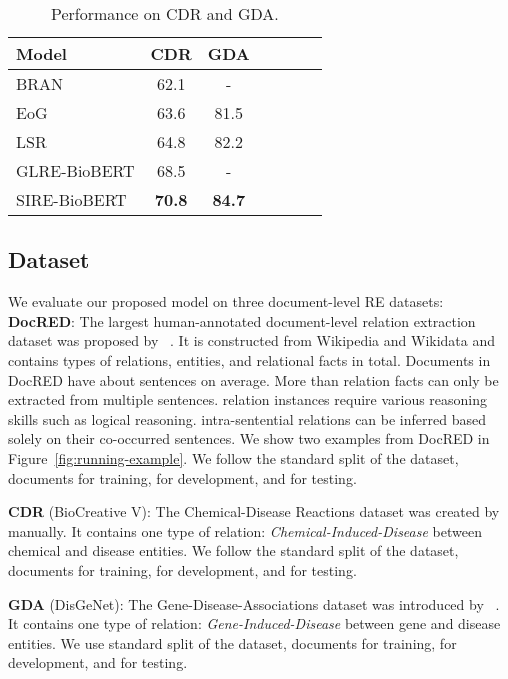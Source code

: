 \documentclass[11pt,a4paper]{article}
\begin{document}
\begin{table}[htbp]
\centering
\small
\begin{tabular}{lcccccc}
\hline
\bf Model  & \bf CDR  & \bf GDA \\ 
\hline
BRAN \citep{BRAN} & 62.1 & - \\
EoG \citep{GLRE} & 63.6 & 81.5 \\
LSR \citep{LSR} & 64.8 & 82.2 \\
GLRE-BioBERT \citep{GLRE} & 68.5 & - \\
\hline
SIRE-BioBERT & \textbf{70.8} & \textbf{84.7} \\
\hline
\end{tabular}
\caption{Performance on CDR and GDA.
}
\label{table:results2}
\end{table}

\subsection{Dataset}
We evaluate our proposed model on three document-level RE datasets: \\
\textbf{DocRED}: 
The largest human-annotated document-level relation extraction dataset was proposed by ~\citet{DocRED-paper}. It is constructed from Wikipedia and Wikidata and contains  types of relations,  entities, and  relational facts in total. Documents in DocRED have about  sentences on average. More than  relation facts can only be extracted from multiple sentences.
 relation instances require various reasoning skills such as logical reasoning.  intra-sentential relations can be inferred based solely on their co-occurred sentences. We show two examples from DocRED in Figure~\ref{fig:running-example}. We follow the standard split of the dataset,  documents for training,  for development, and  for testing. 

\noindent
\textbf{CDR} (BioCreative V): The Chemical-Disease Reactions dataset was created by ~\citet{CDR} manually. It contains one type of relation: \textit{Chemical-Induced-Disease} between chemical and disease entities. We follow the standard split of the dataset,  documents for training,  for development, and  for testing. 

\noindent
\textbf{GDA} (DisGeNet): The Gene-Disease-Associations dataset was introduced by ~\citet{GDA}.
It contains one type of relation: \textit{Gene-Induced-Disease} between gene and disease entities.
We use standard split of the dataset,  documents for training,  for development, and  for testing. 
\end{document}
